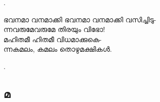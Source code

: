 \begin{enumerate}

.


\begin{slokam}{\VDv}{\VCBP}{ഭവനമാ വനമാക്കി}
ഭവനമാ വനമാക്കി വസിച്ചിടു-\\
ന്നവരുമേവരുമേ തിരയും വിഭോ!\\
മഹിതമീ ഹിതമീ വിധമാക്കുകെ-\\
ന്നകമലം, കമലം തൊഴുമക്ഷികള്‍.
\end{slokam}


.  

\end{enumerate}


\subsection{മ}

